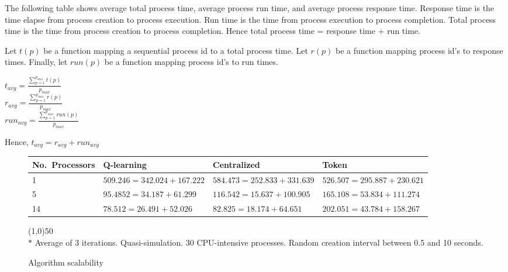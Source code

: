 \documentclass{report}
\begin{document}
\label{sec:scaleresults}

The following table shows average total process time, average process run
time, and average process response time.  Response time is the time elapse
from process creation to process execution.  Run time is the time from
process execution to process completion.  Total process time is the time
from process creation to process completion.  Hence total process time =
response time + run time.  

Let $t(p)$ be a function mapping a sequential process id to a total process
time.  Let $r(p)$ be a function mapping process id's to response times.
Finally, let $run(p)$ be a function mapping process id's to run times.  

\begin{center}
$t_{avg} = \frac{\sum_{p=1}^{p_{max}} {t(p)}}{p_{max}}$ \\
$r_{avg} = \frac{\sum_{p=1}^{p_{max}} {r(p)}}{p_{max}}$ \\
$run_{avg} = \frac{\sum_{p=1}^{p_{max}} {run(p)}}{p_{max}}$
\end{center}

Hence, $t_{avg} = r_{avg} + run_{avg}$

\begin{figure}[H]
\begin{tabularx}{\linewidth}{|X|X|X|X|} \hline
	\textbf{No.\ Processors} & \textbf{Q-learning} & \textbf{Centralized} & \textbf{Token} \\ \hline
	1  & $509.246 = 342.024 + 167.222$ & $ 584.473 = 252.833 + 331.639$ 
		& $ 526.507 = 295.887 + 230.621 $ \\ \hline
	5  & $95.4852 = 34.187 + 61.299$ & $116.542 = 15.637 + 100.905$ &
		$165.108 = 53.834 + 111.274 $ \\ \hline
	14 & $78.512 = 26.491 + 52.026$ & $ 82.825 = 18.174 + 64.651$ & 
		$202.051 = 43.784 + 158.267$ \\ \hline
\end{tabularx}

\vspace{1em}
\line(1,0){50} \\
$*$ Average of 3 iterations.  Quasi-simulation.  30 CPU-intensive processes.
Random creation interval between 0.5 and 10 seconds.
\caption{Algorithm scalability}
\end{figure}
\end{document}
